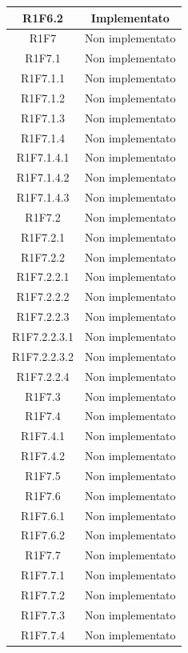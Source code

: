 \begin{longtable}{|c|c|}
	\hline
	{R1F6.2} & Implementato\\
	\hline
	{R1F7} & Non implementato\\
	\hline
	{R1F7.1} & Non implementato\\
	\hline
	{R1F7.1.1} & Non implementato\\
	\hline
	{R1F7.1.2} & Non implementato\\
	\hline
	{R1F7.1.3} & Non implementato\\
	\hline
	{R1F7.1.4} & Non implementato\\
	\hline
	{R1F7.1.4.1} & Non implementato\\
	\hline
	{R1F7.1.4.2} & Non implementato\\
	\hline
	{R1F7.1.4.3} & Non implementato\\
	\hline
	{R1F7.2} & Non implementato\\
	\hline
	{R1F7.2.1} & Non implementato\\
	\hline
	{R1F7.2.2} & Non implementato\\
	\hline
	{R1F7.2.2.1} & Non implementato\\
	\hline
	{R1F7.2.2.2} & Non implementato\\
	\hline
	{R1F7.2.2.3} & Non implementato\\
	\hline
	{R1F7.2.2.3.1} & Non implementato\\
	\hline
	{R1F7.2.2.3.2} & Non implementato\\
	\hline
	{R1F7.2.2.4} & Non implementato\\
	\hline
	{R1F7.3} & Non implementato\\
	\hline
	{R1F7.4} & Non implementato\\
	\hline
	{R1F7.4.1} & Non implementato\\
	\hline
	{R1F7.4.2} & Non implementato\\
	\hline
	{R1F7.5} & Non implementato \\ 
	\hline
	{R1F7.6} & Non implementato\\
	\hline
	{R1F7.6.1} & Non implementato\\
	\hline
	{R1F7.6.2} & Non implementato\\
	\hline
	{R1F7.7} & Non implementato\\
	\hline
	{R1F7.7.1} & Non implementato\\
	\hline
	{R1F7.7.2} & Non implementato\\
	\hline
	{R1F7.7.3} & Non implementato\\
	\hline
	{R1F7.7.4} & Non implementato\\
	\hline

\end{longtable}
